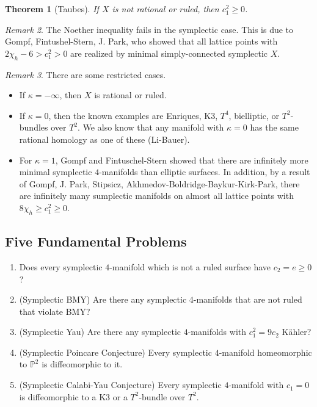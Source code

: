 \documentclass[leqno, openany]{memoir}
\newtheorem{thm}{Theorem}[chapter]
\theoremstyle{definition}
\theoremstyle{remark}
\newtheorem{rmk}[thm]{Remark}
\theoremstyle{plain}
\theoremstyle{definition}
\theoremstyle{remark}
\renewcommand{\P}{\mathbb{P}}
\begin{document}
\begin{thm}[Taubes]
    If $X$ is not rational or ruled, then $c_1^2 \geq 0$.
\end{thm}

\begin{rmk}
    The Noether inequality fails in the symplectic case. This is due to Gompf, Fintushel-Stern, J. Park, who showed that all lattice points with $2 \chi_h - 6 > c_1^2 > 0$ are realized by minimal simply-connected symplectic $X$.
\end{rmk}

\begin{rmk}
    There are some restricted cases.
    \begin{itemize}
        \item If $\kappa = - \infty$, then $X$ is rational or ruled.
        \item If $\kappa = 0$, then the known examples are Enriques, K3, $T^4$, bielliptic, or $T^2$-bundles over $T^2$. We also know that any manifold with $\kappa = 0$ has the same rational homology as one of these (Li-Bauer).
        \item For $\kappa = 1$, Gompf and Fintuschel-Stern showed that there are infinitely more minimal symplectic $4$-manifolds than elliptic surfaces. In addition, by a result of Gompf, J. Park, Stipsicz, Akhmedov-Boldridge-Baykur-Kirk-Park, there are infinitely many sumplectic manifolds on almost all lattice points with $8 \chi_h \geq c_1^2 \geq 0$.
    \end{itemize}
\end{rmk}

\subsection{Five Fundamental Problems}%
\label{sub:five_fundamental_problems}

\begin{enumerate}
    \item Does every symplectic $4$-manifold which is not a ruled surface have $c_2 = e \geq 0$?
    \item (Symplectic BMY) Are there any symplectic $4$-manifolds that are not ruled that violate BMY?
    \item (Symplectic Yau) Are there any symplectic $4$-manifolds with $c_1^2 = 9c_2$ K\"ahler?
    \item (Symplectic Poincare Conjecture) Every symplectic $4$-manifold homeomorphic to $\P^2$ is diffeomorphic to it.
    \item (Symplectic Calabi-Yau Conjecture) Every symplectic $4$-manifold with $c_1 = 0$ is diffeomorphic to a K3 or a $T^2$-bundle over $T^2$.
\end{enumerate}
\end{document}
